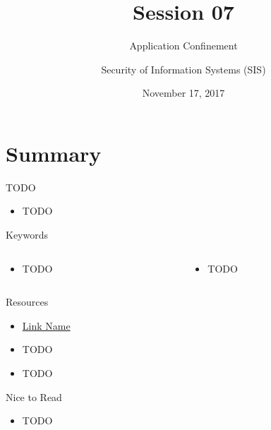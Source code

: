 \documentclass{curs}
\title[Session 07]{Session 07}
\subtitle{Application Confinement}
\author{Security of Information Systems (SIS)}
\date{November 17, 2017}
\begin{document}
\frame{\titlepage}

\section{Summary}

\begin{frame}{TODO}
  \begin{itemize}
    \item TODO
  \end{itemize}
\end{frame}

\begin{frame}{Keywords}
  \begin{columns}
    \begin{column}{0.5\textwidth}
      \begin{itemize}
        \item TODO
      \end{itemize}
    \end{column}
    \begin{column}{0.5\textwidth}
      \begin{itemize}
        \item TODO
      \end{itemize}
    \end{column}
  \end{columns}
\end{frame}

\begin{frame}{Resources}
  \begin{itemize}
    \item \href{https://link.url.com/}{Link Name}
    \item TODO
    \item TODO
  \end{itemize}
\end{frame}

\begin{frame}{Nice to Read}
  \begin{itemize}
    \item TODO
  \end{itemize}
\end{frame}
\end{document}
